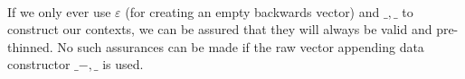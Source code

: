 \begin{code}%
\>[0]\AgdaOperator{\AgdaFunction{\AgdaUnderscore{},\AgdaUnderscore{}}}\AgdaSpace{}%
\AgdaSymbol{:}\AgdaSpace{}%
\AgdaSpace{}%
\AgdaSpace{}%
\AgdaSpace{}%
\AgdaSpace{}%
\AgdaSpace{}%
\AgdaSpace{}%
\AgdaSpace{}%
\AgdaSymbol{(}\AgdaSpace{}%
\AgdaSymbol{)}\<%
\\
\>[0]\AgdaSpace{}%
\AgdaOperator{\AgdaFunction{,}}\AgdaSpace{}%
\AgdaSpace{}%
\AgdaSymbol{=}\AgdaSpace{}%
\AgdaSymbol{(}\AgdaSpace{}%
\AgdaOperator{\AgdaInductiveConstructor{-,}}\AgdaSpace{}%
\AgdaSymbol{)}\AgdaSpace{}%
\<%
\end{code}
If we only ever use $ε$ (for creating an empty backwards vector) and $\_ , \_$
to construct our contexts, we can be assured that they will always be valid and
pre-thinned. No such assurances can be made if the raw vector appending data
constructor $\_ -,\_$ is used.
